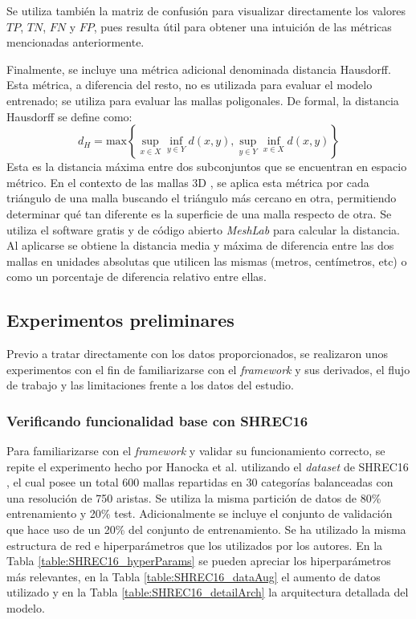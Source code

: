 Se utiliza también la matriz de confusión para visualizar directamente los valores $TP$, $TN$, $FN$ y $FP$, pues resulta útil para obtener una intuición de las métricas mencionadas anteriormente.

Finalmente, se incluye una métrica adicional denominada distancia Hausdorff. Esta métrica, a diferencia del resto, no es utilizada para evaluar el modelo entrenado; se utiliza para evaluar las mallas poligonales. De formal, la distancia Hausdorff se define como:
\begin{equation}
    d_H = \text{max}\left\{\sup_{x\in X} \inf_{y \in Y} d(x,y),  \sup_{y\in Y} \inf_{x \in X} d(x,y) \right\}
\end{equation}
Esta es la distancia máxima entre dos subconjuntos que se encuentran en espacio métrico. En el contexto de las mallas 3D \cite{cignoni1998metro}, se aplica esta métrica por cada triángulo de una malla buscando el triángulo más cercano en otra, permitiendo determinar qué tan diferente es la superficie de una malla respecto de otra. Se utiliza el software gratis y de código abierto \textit{MeshLab} \cite{meshlab} para calcular la distancia. Al aplicarse se obtiene la distancia media y máxima de diferencia entre las dos mallas en unidades absolutas que utilicen las mismas (metros, centímetros, etc) o como un porcentaje de diferencia relativo entre ellas.

\subsection{Experimentos preliminares}
Previo a tratar directamente con los datos proporcionados, se realizaron unos experimentos con el fin de familiarizarse con el \textit{framework} y sus derivados, el flujo de trabajo y las limitaciones frente a los datos del estudio.
\subsubsection{Verificando funcionalidad base con SHREC16}
Para familiarizarse con el \textit{framework} y validar su funcionamiento correcto, se repite el experimento hecho por Hanocka et al. \cite{hanocka2019meshcnn} utilizando el \textit{dataset} de SHREC16 \cite{lian2011shape}, el cual posee un total 600 mallas repartidas en 30 categorías balanceadas con una resolución de 750 aristas. Se utiliza la misma partición de datos de 80\% entrenamiento y 20\% test. Adicionalmente se incluye el conjunto de validación que hace uso de un 20\% del conjunto de entrenamiento. Se ha utilizado la misma estructura de red e hiperparámetros que los utilizados por los autores. En la Tabla \ref{table:SHREC16_hyperParams} se pueden apreciar los hiperparámetros más relevantes, en la Tabla \ref{table:SHREC16_dataAug} el aumento de datos utilizado y en la Tabla \ref{table:SHREC16_detailArch}  la arquitectura detallada del modelo.

